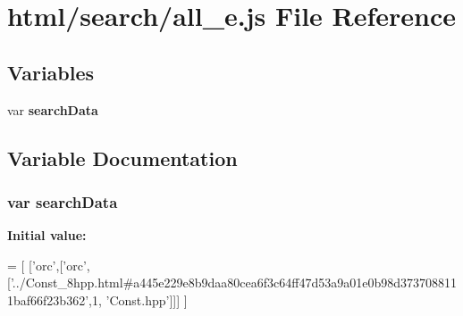 \section{html/search/all\-\_\-e.js File Reference}
\label{all__e_8js}
\subsection*{Variables}
\begin{DoxyCompactItemize}
\item 
var {\bf search\-Data}
\end{DoxyCompactItemize}


\subsection{Variable Documentation}
\subsubsection[{search\-Data}]{\setlength{\rightskip}{0pt plus 5cm}var search\-Data}\label{all__e_8js_ad01a7523f103d6242ef9b0451861231e}
{\bfseries Initial value\-:}
\begin{DoxyCode}
=
[
  [\textcolor{stringliteral}{'orc'},[\textcolor{stringliteral}{'orc'},[\textcolor{stringliteral}{'../Const\_8hpp.html#a445e229e8b9daa80cea6f3c64ff47d53a9a01e0b98d3737088111baf66f23b362'},1,\textcolor{stringliteral}{
      'Const.hpp'}]]]
]
\end{DoxyCode}
